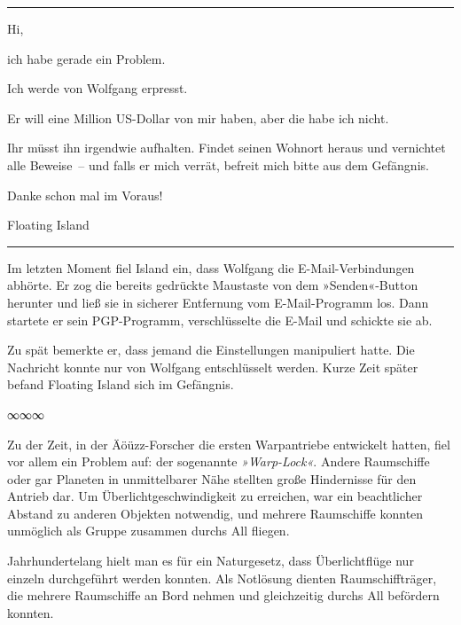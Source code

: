 \noindent \parbox{\textwidth}{ \vspace{3ex} \hrule \vspace{3ex}

    \begin{footnotesize}
    \begin{ttfamily}

\noindent Hi,

\noindent ich habe gerade ein Problem.

\noindent Ich werde von Wolfgang erpresst.

\noindent Er will eine Million US-Dollar von mir haben, aber die habe ich nicht.

\noindent Ihr müsst ihn irgendwie aufhalten. Findet seinen Wohnort heraus und vernichtet alle Beweise~– und falls er mich verrät, befreit mich bitte aus dem Gefängnis.

\noindent Danke schon mal im Voraus!

\noindent Floating Island

    \end{ttfamily}
    \end{footnotesize}

\vspace{3ex} \hrule \vspace{3ex} }

Im letzten Moment fiel Island ein, dass Wolfgang die E-Mail-Verbindungen abhörte. Er zog die bereits gedrückte Maustaste von dem »Senden«-Button herunter und ließ sie in sicherer Entfernung vom E-Mail-Programm los. Dann startete er sein PGP-Programm, verschlüsselte die E-Mail und schickte sie ab.

Zu spät bemerkte er, dass jemand die Einstellungen manipuliert hatte. Die Nachricht konnte nur von Wolfgang entschlüsselt werden. Kurze Zeit später befand Floating Island sich im Gefängnis.

\begin{center}
    ∞∞∞
\end{center}

Zu der Zeit, in der Äöüzz-Forscher die ersten Warpantriebe entwickelt hatten, fiel vor allem ein Problem auf: der sogenannte \textit{»Warp-Lock«}. Andere Raumschiffe oder gar Planeten in unmittelbarer Nähe stellten große Hindernisse für den Antrieb dar. Um Überlichtgeschwindigkeit zu erreichen, war ein beachtlicher Abstand zu anderen Objekten notwendig, und mehrere Raumschiffe konnten unmöglich als Gruppe zusammen durchs All fliegen.

Jahrhundertelang hielt man es für ein Naturgesetz, dass Überlichtflüge nur einzeln durchgeführt werden konnten. Als Notlösung dienten Raumschiffträger, die mehrere Raumschiffe an Bord nehmen und gleichzeitig durchs All befördern konnten.

